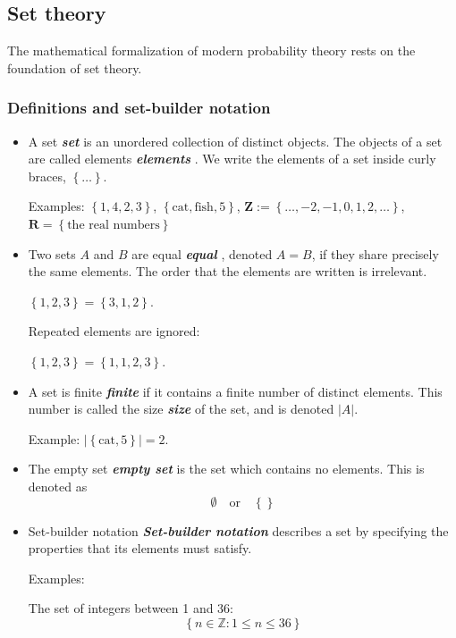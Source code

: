 \documentclass[10pt]{article}
\theoremstyle{definition}
\newcommand{\1}[1]{\textbf{1}_{\left[#1\right]}} %
\DeclareRobustCommand{\demph}[1]{%
  \ifmmode
  {\color{Blue}#1}%
  \else
  {\color{Blue}\bfseries\slshape #1}%
  \fi
}
\begin{document}
\subsection{Set theory}

The mathematical formalization of modern probability theory rests on the
foundation of set theory.

\subsubsection{Definitions and set-builder notation}
\begin{itemize}
  \item A \demph{set} is an unordered collection of distinct objects. The
  objects of a set are called \demph{elements}. We write the elements of a set
  inside curly braces, $\left\{\ldots\right\}$.

  Examples: $\left\{1,4,2,3\right\}$,  $\left\{\text{cat}, \text{fish}, 5
  \right\}$, $\mathbf{Z}:= \left\{\ldots, -2, -1, 0, 1, 2,\ldots\right\}$,
  $\mathbf{R}=\left\{\text{the real numbers}\right\}$

  \item Two sets $A$ and $B$ are \demph{equal}, denoted $A=B$, if they share
  precisely the same elements. The order that the elements are written is
  irrelevant.

  $\left\{1,2,3\right\}=\left\{3,1,2\right\}$.
  
  Repeated elements are ignored:

  $\left\{1,2,3\right\}=\left\{1,1,2,3\right\}$.
  
  \item A set is \demph{finite} if it contains a finite number of distinct
  elements. This number is called the \demph{size} of the set, and is denoted
  $|A|$.

  Example: $|\left\{\text{cat}, 5\right\}|=2$.
  
  \item The \demph{empty set} is the set which contains no elements. This is
  denoted as
  \begin{equation*}
    \emptyset \quad \text{or} \quad \left\{\right\} 
  \end{equation*}
  \item \demph{Set-builder notation} describes a set by specifying the
  properties that its elements must satisfy.


  Examples:

  The set of integers between 1 and 36:
  \begin{equation*}
    \left\{n\in \mathbb{Z}: 1 \leq n \leq 36\right\} 
  \end{equation*}


\end{itemize}
\end{document}
